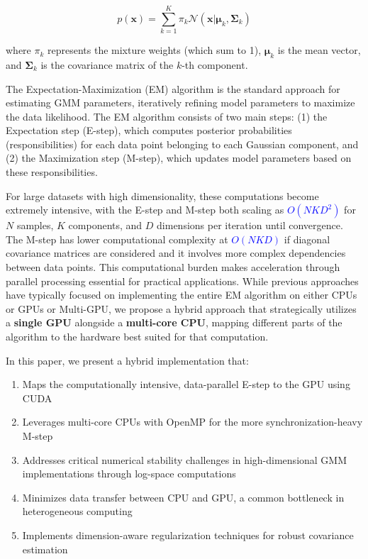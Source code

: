 \documentclass[conference]{IEEEtran}
\begin{document}
\begin{equation}
p(\mathbf{x}) = \sum_{k=1}^{K} \pi_k \mathcal{N}(\mathbf{x}|\boldsymbol{\mu}_k, \boldsymbol{\Sigma}_k)
\end{equation}

\noindent where $\pi_k$ represents the mixture weights (which sum to 1), $\boldsymbol{\mu}_k$ is the mean vector, and $\boldsymbol{\Sigma}_k$ is the covariance matrix of the $k$-th component.

The Expectation-Maximization (EM) algorithm is the standard approach for estimating GMM parameters, iteratively refining model parameters to maximize the data likelihood. The EM algorithm consists of two main steps: (1) the Expectation step (E-step), which computes posterior probabilities (responsibilities) for each data point belonging to each Gaussian component, and (2) the Maximization step (M-step), which updates model parameters based on these responsibilities.

For large datasets with high dimensionality, these computations become extremely intensive, with the E-step and M-step both scaling as \textcolor{blue}{$O(NKD^2)$} for $N$ samples, $K$ components, and $D$ dimensions per iteration until convergence. The M-step has lower computational complexity at \textcolor{blue}{$O(NKD)$} if diagonal covariance matrices are considered and it involves more complex dependencies between data points. This computational burden makes acceleration through parallel processing essential for practical applications. While previous approaches have typically focused on implementing the entire EM algorithm on either CPUs or GPUs or Multi-GPU, we propose a hybrid approach that strategically utilizes a \textbf{single GPU} alongside a \textbf{multi-core CPU}, mapping different parts of the algorithm to the hardware best suited for that computation.

In this paper, we present a hybrid implementation that:
\begin{enumerate}
    \item Maps the computationally intensive, data-parallel E-step to the GPU using CUDA
    \item Leverages multi-core CPUs with OpenMP for the more synchronization-heavy M-step
    \item Addresses critical numerical stability challenges in high-dimensional GMM implementations through log-space computations
    \item Minimizes data transfer between CPU and GPU, a common bottleneck in heterogeneous computing
    \item Implements dimension-aware regularization techniques for robust covariance estimation
\end{enumerate}
\end{document}
